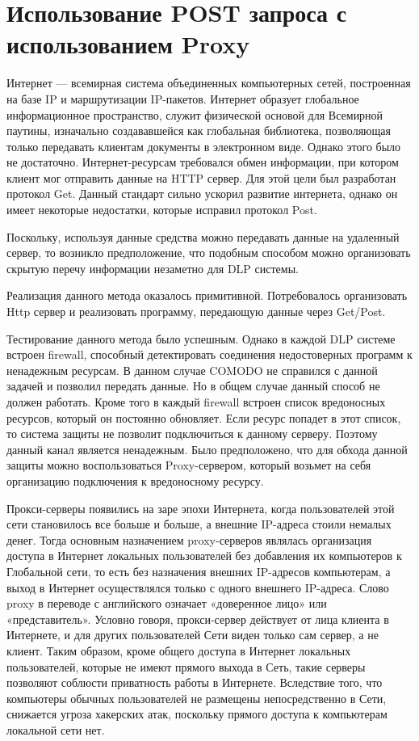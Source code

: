 \section{Использование POST запроса с использованием Proxy}

Интернет --- всемирная система объединенных компьютерных сетей, построенная на базе IP и маршрутизации IP-пакетов. Интернет образует глобальное информационное пространство, служит физической основой для Всемирной паутины, изначально создававшейся как глобальная библиотека, позволяющая только передавать клиентам документы в электронном виде. Однако этого было не достаточно. Интернет-ресурсам требовался обмен информации, при котором клиент мог отправить данные на HTTP сервер. Для этой цели был разработан протокол Get. Данный стандарт сильно ускорил развитие интернета, однако он имеет некоторые недостатки, которые исправил протокол Post.

Поскольку, используя данные средства можно передавать данные на удаленный сервер, то возникло предположение, что подобным способом можно организовать скрытую перечу информации незаметно для DLP системы.

Реализация данного метода оказалось примитивной. Потребовалось организовать Http сервер и реализовать программу, передающую данные через Get/Post. 

Тестирование данного метода было успешным. Однако в каждой DLP системе встроен firewall, способный детектировать соединения недостоверных программ к ненадежным ресурсам. В данном случае COMODO не справился с данной задачей и позволил передать данные. Но в общем случае данный способ не должен работать. Кроме того в каждый firewall встроен список вредоносных ресурсов, который он постоянно обновляет. Если ресурс попадет в этот список, то система защиты не позволит подключиться к данному серверу. Поэтому данный канал является ненадежным. Было предположено, что для обхода данной защиты можно воспользоваться Proxy-сервером, который возьмет на себя организацию подключения к вредоносному ресурсу.


Прокси-серверы появились на заре эпохи Интернета, когда пользователей этой сети становилось все больше и больше, а внешние IP-адреса стоили немалых денег. Тогда основным назначением proxy-серверов являлась организация доступа в Интернет локальных пользователей без добавления их компьютеров к Глобальной сети, то есть без назначения внешних IP-адресов компьютерам, а выход в Интернет осуществлялся только с одного внешнего IP-адреса. Слово proxy в переводе с английского означает «доверенное лицо» или «представитель». Условно говоря, прокси-сервер действует от лица клиента в Интернете, и для других пользователей Сети виден только сам сервер, а не клиент. Таким образом, кроме общего доступа в Интернет локальных пользователей, которые не имеют прямого выхода в Сеть, такие серверы позволяют соблюсти приватность работы в Интернете. Вследствие того, что компьютеры обычных пользователей не размещены непосредственно в Сети, снижается угроза хакерских атак, поскольку прямого доступа к компьютерам локальной сети нет.

